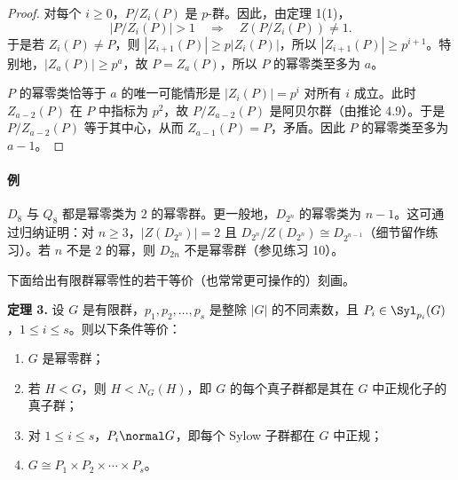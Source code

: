 \begin{proof}
对每个 $i\geq 0$，$P/Z_i(P)$ 是 $p$-群。因此，由定理 1(1)，
\[
  |P/Z_i(P)|>1\quad\Longrightarrow\quad Z(P/Z_i(P))\neq 1.
\]
于是若 $Z_i(P)\neq P$，则 $|Z_{i+1}(P)|\geq p|Z_i(P)|$，所以 $|Z_{i+1}(P)|\geq p^{i+1}$。特别地，$|Z_a(P)|\geq p^a$，故 $P=Z_a(P)$，所以 $P$ 的幂零类至多为 $a$。

$P$ 的幂零类恰等于 $a$ 的唯一可能情形是 $|Z_i(P)|=p^i$ 对所有 $i$ 成立。此时 $Z_{a-2}(P)$ 在 $P$ 中指标为 $p^2$，故 $P/Z_{a-2}(P)$ 是阿贝尔群（由推论 4.9）。于是 $P/Z_{a-2}(P)$ 等于其中心，从而 $Z_{a-1}(P)=P$，矛盾。因此 $P$ 的幂零类至多为 $a-1$。
\end{proof}

\paragraph{例} $D_8$ 与 $Q_8$ 都是幂零类为 $2$ 的幂零群。更一般地，$D_{2^n}$ 的幂零类为 $n-1$。这可通过归纳证明：对 $n\geq 3$，$|Z(D_{2^n})|=2$ 且 $D_{2^n}/Z(D_{2^n})\cong D_{2^{n-1}}$（细节留作练习）。若 $n$ 不是 $2$ 的幂，则 $D_{2n}$ 不是幂零群（参见练习 10）。

下面给出有限群幂零性的若干等价（也常常更可操作的）刻画。

\medskip
\noindent\textbf{定理 3.} 设 $G$ 是有限群，$p_1,p_2,\ldots,p_s$ 是整除 $|G|$ 的不同素数，且 $P_i\in\Syl_{p_i}(G)$，$1\leq i\leq s$。则以下条件等价：
\begin{enumerate}[label=(\arabic*)]
  \item $G$ 是幂零群；
  \item 若 $H<G$，则 $H<N_G(H)$，即 $G$ 的每个真子群都是其在 $G$ 中正规化子的真子群；
  \item 对 $1\leq i\leq s$，$P_i\normal G$，即每个 Sylow 子群都在 $G$ 中正规；
  \item $G\cong P_1\times P_2\times\cdots\times P_s$。
\end{enumerate}


